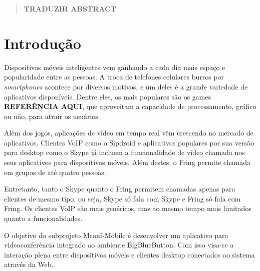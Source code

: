 \documentclass{acm_proc_article-sp}
\newcommand{\todo}[1]{\textcolor[rgb]{1.00,0.00,0.00}{\bf \uppercase{#1}}}
\begin{document}
\begin{abstract}
\todo{traduzir abstract}
\end{abstract}






\section{Introdução}

Dispositivos móveis inteligentes vem ganhando a cada dia mais espaço e popularidade entre as pessoas. A troca de telefones celulares burros por \emph{smartphones} acontece por diversos motivos, e um deles é a grande variedade de aplicativos disponíveis. Dentre eles, os mais populares são os games \todo{referência aqui}, que aproveitam a capacidade de processamento, gráfico ou não, para atrair os usuários.

Além dos jogos, aplicações de vídeo em tempo real vêm crescendo no mercado de aplicativos. Clientes VoIP como o Sipdroid e aplicativos populares por sua versão para desktop como o Skype já incluem a funcionalidade de vídeo chamada nos seus aplicativos para dispositivos móveis. Além destes, o Fring permite chamada em grupos de até quatro pessoas.

Entretanto, tanto o Skype quanto o Fring permitem chamadas apenas para clientes de mesmo tipo, ou seja, Skype só fala com Skype e Fring só fala com Fring. Os clientes VoIP são mais genéricos, mas ao mesmo tempo mais limitados quanto a funcionalidades.

O objetivo do subprojeto Mconf-Mobile é desenvolver um aplicativo para videoconferência integrado ao ambiente BigBlueButton. Com isso visa-se a interação plena entre dispositivos móveis e clientes desktop conectados ao sistema através da Web.
\end{document}
